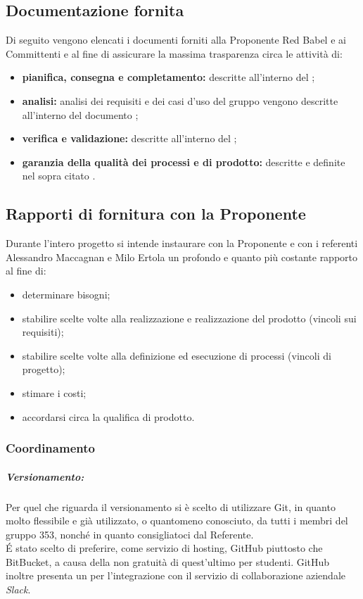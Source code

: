 \subsection{Documentazione fornita}
Di seguito vengono elencati i documenti forniti alla Proponente Red Babel e ai Committenti \Vardanega{} e \Cardin{} al fine di assicurare la massima trasparenza circa le attività di:
\begin{itemize}
	\item \textbf{pianifica, consegna e completamento:} descritte all'interno del \pdp \vruno;
	\item \textbf{analisi:} analisi dei requisiti e dei casi d'uso del gruppo vengono descritte all'interno del documento \adr \vruno;
	\item \textbf{verifica e validazione:} descritte all'interno del \pdq \vruno;
	\item \textbf{garanzia della qualità dei processi e di prodotto:} descritte e definite nel sopra citato \pdq \vruno.
\end{itemize}

\subsection{Rapporti di fornitura con la Proponente \Proponente}
Durante l'intero progetto si intende instaurare con la Proponente \Proponente{} e con i referenti Alessandro Maccagnan e Milo Ertola un profondo e quanto più costante rapporto al fine di:
\begin{itemize}
	\item determinare bisogni;
	\item stabilire scelte volte alla realizzazione e realizzazione del prodotto (vincoli sui requisiti);
	\item stabilire scelte volte alla definizione ed esecuzione di processi (vincoli di progetto);
	\item stimare i costi;
	\item accordarsi circa la qualifica di prodotto.
\end{itemize}


	\subsubsection{Coordinamento}
\subparagraph{Versionamento:} Per quel che riguarda il versionamento si è scelto di utilizzare Git, in quanto molto flessibile e già utilizzato, o quantomeno conosciuto, da tutti i membri del gruppo 353, nonché in quanto consigliatoci dal Referente.\\
\'{E} stato scelto di preferire, come servizio di hosting, GitHub piuttosto che BitBucket, a causa della non gratuità di quest'ultimo per studenti. GitHub inoltre presenta un  per l'integrazione con il servizio di collaborazione aziendale \emph{Slack}.



